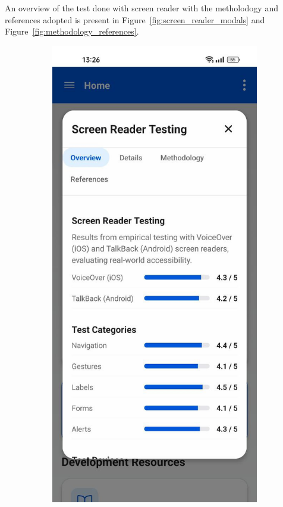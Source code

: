 An overview of the test done with screen reader with the metholodogy and references adopted is present in Figure~\ref{fig:screen_reader_modals} and Figure~\ref{fig:methodology_references}.

\begin{figure}[ht]
    \centering
    \begin{subfigure}[b]{0.48\textwidth}
        \centering
        \includegraphics[width=\linewidth]{img/screen-reader-modal.jpg}

\end{subfigure}
\end{figure}
